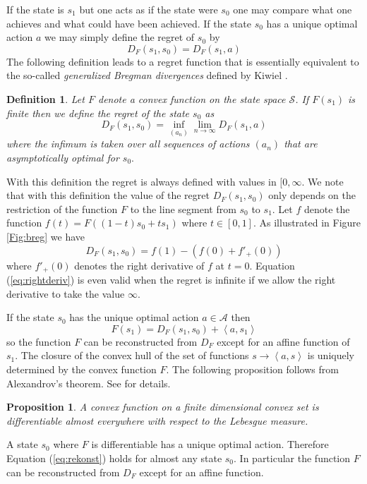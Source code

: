 \documentclass[10pt,a4paper,draft]{article}
\newtheorem{Prop}{Proposition}
\newtheorem{Definition}{Definition}
\begin{document}
If the state is $s_{1}$ but one acts as if the state were
$s_{0}$ one may compare what one
achieves and what could have been achieved. If the state $s_0$ has a unique optimal action $a$ we may simply define the regret of $s_0$ by
\[
D_{F}\left(s_{1},s_{0}\right)=D_{F}\left(s_{1},a\right)
\]
The following definition leads to a regret function that is essentially equivalent to the so-called {\em generalized Bregman divergences} defined by Kiwiel \cite{Kiwiel1997,Kiwiel1997a}. 

\begin{Definition}\label{def:regret} 
Let $F$ denote a convex function on the
state space $\mathcal{S}$. If $F\left(s_{1}\right)$ is
finite then we define \emph{the regret of the state} $s_{0}$ as 
\[
D_{F}\left(s_{1},s_{0}\right)=\inf_{\left(a_n\right)}\lim_{n\to \infty}D_{F}\left(s_{1},a\right)
\]
where the infimum is taken over all sequences of actions $\left(a_n\right)$ that are asymptotically optimal for $s_{0}.$ 
\end{Definition}

With this definition the regret is always defined with values in $[0,\infty$. We note that with this definition the value of the regret $D_{F}\left(s_{1},s_{0}\right)$ only depends on the restriction of the function $F$ to the line segment from $s_0$ to $s_1$. Let $f$ denote the function $f(t)=F\left((1-t)s_0 +t s_1 \right)$ where $t\in[0,1]$. As illustrated in Figure \ref{Fig:breg} we have
\begin{equation}\label{eq:rightderiv}
D_F\left(s_1 ,s_0 \right)=f\left(1 \right) - \left( f\left(0\right)+ f'_+ (0) \right)
\end{equation}
where $f'_+ (0)$ denotes the right derivative of $f$ at $t=0$. Equation (\ref{eq:rightderiv}) is even valid when the regret is infinite if we allow the right derivative to take the value $\infty$.

If the state $s_{0}$ has the unique optimal action $a\in\mathcal{A}$ then
\begin{equation}\label{eq:rekonst}
F\left(s_{1}\right)=D_{F}\left(s_{1},s_{0}\right)+\left\langle
a,s_{1}\right\rangle
\end{equation}
so the function $F$ can be reconstructed from $D_{F}$ except for an affine function of $s_{1}.$ The closure of the convex hull of the set of functions $s\to\left\langle a,s\right\rangle $ is
uniquely determined by the convex function $F.$ The following proposition follows from Alexandrov's theorem. See
\cite[Theorem 25.5]{Rockafeller1970} for details.
\begin{Prop}
A convex function on a finite dimensional convex set is
differentiable almost everywhere with respect to the Lebesgue measure. 
\end{Prop}
A state $s_0$ where $F$ is differentiable has a unique optimal action. Therefore Equation (\ref{eq:rekonst}) holds for almost any state $s_0$. In particular the function $F$ can be reconstructed from $D_F$ except for an affine function.
\end{document}
